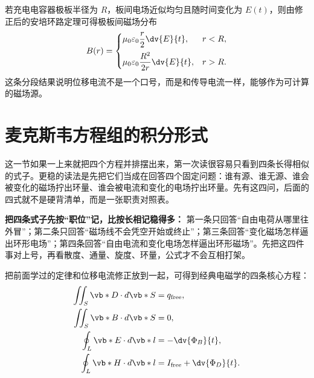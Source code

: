 \documentclass[lang=cn,11pt]{elegantbook}
\newcommand{\bridge}[1]{\begin{note}#1\end{note}}
\begin{document}
\begin{center}
\end{center}

\begin{remark}
若充电电容器极板半径为 \(R\)，板间电场近似均匀且随时间变化为 \(E(t)\)，则由修正后的安培环路定理可得极板间磁场分布
\[
B(r)=
\begin{cases}
\mu_0\varepsilon_0\dfrac{r}{2}\dv{E}{t}, & r<R,\\[8pt]
\mu_0\varepsilon_0\dfrac{R^2}{2r}\dv{E}{t}, & r>R.
\end{cases}
\]
这条分段结果说明位移电流不是一个口号，而是和传导电流一样，能够作为可计算的磁场源。
\end{remark}

\section{麦克斯韦方程组的积分形式}

\bridge{这一节如果一上来就把四个方程并排摆出来，第一次读很容易只看到四条长得相似的式子。更稳的读法是先把它们当成在回答四个固定问题：谁有源、谁无源、谁会被变化的磁场拧出环量、谁会被电流和变化的电场拧出环量。先有这四问，后面的四式就不是硬背清单，而是一张职责对照表。}

\begin{note}
\textbf{把四条式子先按“职位”记，比按长相记稳得多：} 第一条只回答“自由电荷从哪里往外冒”；第二条只回答“磁场线不会凭空开始或终止”；第三条回答“变化磁场怎样逼出环形电场”；第四条回答“自由电流和变化电场怎样逼出环形磁场”。先把这四件事对上号，再看散度、通量、旋度、环量，公式才不会互相打架。
\end{note}

把前面学过的定律和位移电流修正放到一起，可得到经典电磁学的四条核心方程：
\begin{align*}
\iint_S \vb*{D}\cdot d\vb*{S}&=q_{\mathrm{free}},\\
\iint_S \vb*{B}\cdot d\vb*{S}&=0,\\
\oint_L \vb*{E}\cdot d\vb*{l}&=-\dv{\Phi_B}{t},\\
\oint_L \vb*{H}\cdot d\vb*{l}&=I_{\mathrm{free}}+\dv{\Phi_D}{t}.
\end{align*}
\end{document}
